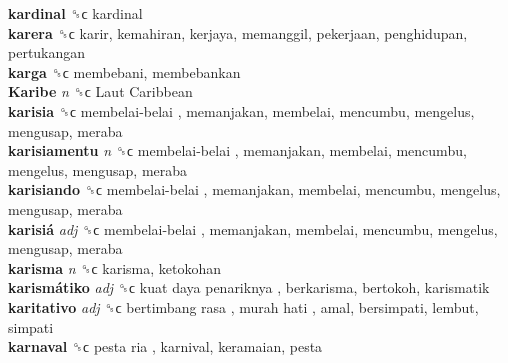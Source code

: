 \textbf{kardinal} ␝ϲ  kardinal  \\
\textbf{karera} ␝ϲ  karir, kemahiran, kerjaya, memanggil, pekerjaan, penghidupan, pertukangan  \\
\textbf{karga} ␝ϲ  membebani, membebankan  \\
\textbf{Karibe} \emph{n}  ␝ϲ   Laut Caribbean   \\
\textbf{karisia} ␝ϲ   membelai-belai , memanjakan, membelai, mencumbu, mengelus, mengusap, meraba  \\
\textbf{karisiamentu} \emph{n}  ␝ϲ   membelai-belai , memanjakan, membelai, mencumbu, mengelus, mengusap, meraba  \\
\textbf{karisiando} ␝ϲ   membelai-belai , memanjakan, membelai, mencumbu, mengelus, mengusap, meraba  \\
\textbf{karisiá} \emph{adj}  ␝ϲ   membelai-belai , memanjakan, membelai, mencumbu, mengelus, mengusap, meraba  \\
\textbf{karisma} \emph{n}  ␝ϲ  karisma, ketokohan  \\
\textbf{karismátiko} \emph{adj}  ␝ϲ   kuat daya penariknya , berkarisma, bertokoh, karismatik  \\
\textbf{karitativo} \emph{adj}  ␝ϲ   bertimbang rasa ,  murah hati , amal, bersimpati, lembut, simpati  \\
\textbf{karnaval} ␝ϲ   pesta ria , karnival, keramaian, pesta  \\
